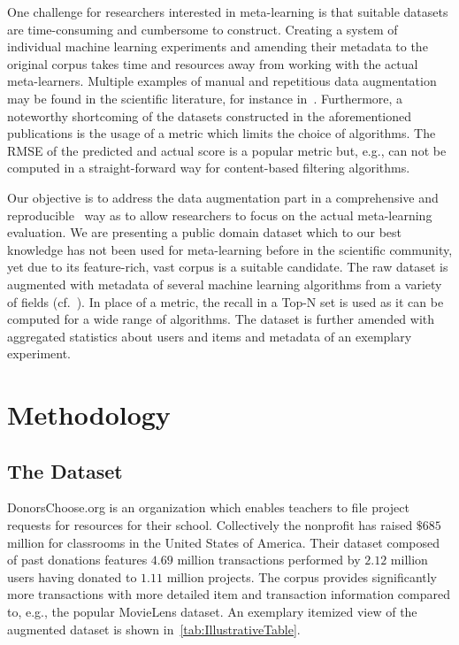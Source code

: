 \documentclass[runningheads]{llncs}
\begin{document}
One challenge for researchers interested in meta-learning is that suitable datasets are time-consuming and cumbersome to construct. Creating a system of individual machine learning experiments and amending their metadata to the original corpus takes time and resources away from working with the actual meta-learners. Multiple examples of manual and repetitious data augmentation may be found in the scientific literature, for instance in~\cite{CUNHA2018128,DBLP:journals/corr/abs-1805-12118,Ekstrand:2012:RFP:2365952.2366002}. Furthermore, a noteworthy shortcoming of the datasets constructed in the aforementioned publications is the usage of a metric which limits the choice of algorithms. The RMSE of the predicted and actual score is a popular metric but, e.g., can not be computed in a straight-forward way for content-based filtering algorithms.

Our objective is to address the data augmentation part in a comprehensive and reproducible~\cite{UMUAI:TowardsReproducibilityInRecSysBeel2016} way as to allow researchers to focus on the actual meta-learning evaluation. We are presenting a public domain dataset which to our best knowledge has not been used for meta-learning before in the scientific community, yet due to its feature-rich, vast corpus is a suitable candidate. The raw dataset is augmented with metadata of several machine learning algorithms from a variety of fields (cf.~\cite{DBLP:journals/corr/abs-1805-12118}). In place of a metric, the recall in a Top-N set is used as it can be computed for a wide range of algorithms. The dataset is further amended with aggregated statistics about users and items and metadata of an exemplary experiment.

\section{Methodology}

\subsection{The Dataset}
DonorsChoose.org is an organization which enables teachers to file project requests for resources for their school. Collectively the nonprofit has raised $\$685$ million for classrooms in the United States of America. Their dataset composed of past donations features $4.69$ million transactions performed by $2.12$ million users having donated to $1.11$ million projects. The corpus provides significantly more transactions with more detailed item and transaction information compared to, e.g., the popular MovieLens dataset. An exemplary itemized view of the augmented dataset is shown in~\autoref{tab:IllustrativeTable}.
\end{document}
